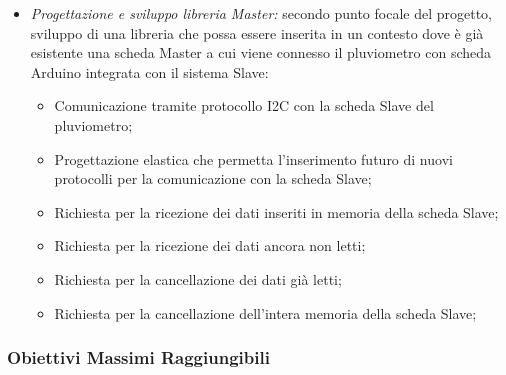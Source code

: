 \begin{itemize}
\begin{itemize}
\begin{itemize}
			\end{itemize}
			\item \textit{Progettazione e sviluppo libreria Master:} secondo punto focale del progetto, sviluppo di una libreria che possa essere inserita in un contesto dove è già esistente una scheda Master a cui viene connesso il pluviometro con scheda Arduino integrata con il sistema Slave:
			\begin{itemize}
				\item Comunicazione tramite protocollo I2C con la scheda Slave del pluviometro;
				\item Progettazione elastica che permetta l'inserimento futuro di nuovi protocolli per la comunicazione con la scheda Slave;
				\item Richiesta per la ricezione dei dati inseriti in memoria della scheda Slave;
				\item Richiesta per la ricezione dei dati ancora non letti;
				\item Richiesta per la cancellazione dei dati già letti;
				\item Richiesta per la cancellazione dell'intera memoria della scheda Slave;
			\end{itemize}
		\end{itemize}

\end{itemize}



\subsubsection{Obiettivi Massimi Raggiungibili}

